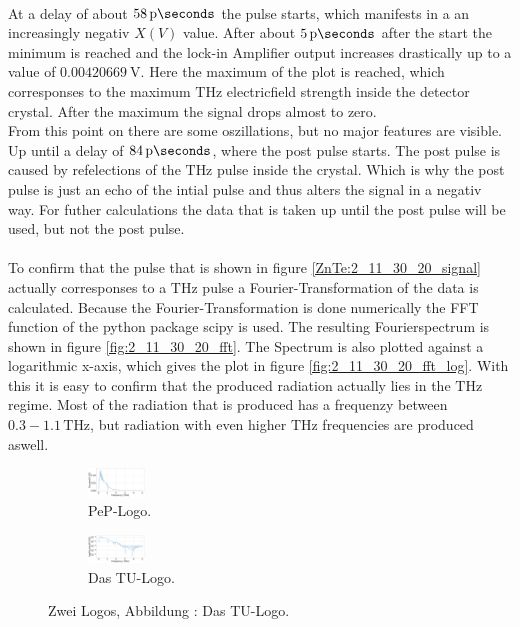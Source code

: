 \\
At a delay of about $\SI{58}{\pico\seconds}$ the pulse starts, which manifests in a an increasingly negativ $X(V)$ value.
After about $\SI{5}{\pico\seconds}$ after the start the minimum is reached and the lock-in Amplifier output increases drastically up to a value of $\SI{0.00420669}{\V}$.
Here the maximum of the plot is reached, which corresponses to the maximum $\si{\tera\hertz}$ electricfield strength inside the detector crystal.
After the maximum the signal drops almost to zero.
\\
From this point on there are some oszillations, but no major features are visible. %
Up until a delay of $\SI{84}{\pico\seconds}$, where the post pulse starts.
The post pulse is caused by refelections of the $\si{\tera\hertz}$ pulse inside the crystal.
Which is why the post pulse is just an echo of the intial pulse and thus alters the signal in a negativ way.
For futher calculations the data that is taken up until the post pulse will be used, but not the post pulse.
\\\\
\FloatBarrier
To confirm that the pulse that is shown in figure \ref{ZnTe:2_11_30_20_signal} actually corresponses to a $\si{\tera\hertz}$ pulse a Fourier-Transformation of the data is calculated. %
Because the Fourier-Transformation is done numerically the FFT function of the python package scipy \cite{scipy} is used.
The resulting Fourierspectrum is shown in figure \ref{fig:2_11_30_20_fft}.
The Spectrum is also plotted against a logarithmic x-axis, which gives the plot in figure \ref{fig:2_11_30_20_fft_log}.
With this it is easy to confirm that the produced radiation actually lies in the $\si{\tera\hertz}$ regime.
Most of the radiation that is produced has a frequenzy between $0.3-1.1\,\si{\tera\hertz}$, but radiation with even higher $\si{\tera\hertz}$ frequencies are produced aswell.
\begin{figure}%
    \begin{subfigure}{0.48\textwidth}%
        \centering%
        \includegraphics[height=0.75cm]{Plots/2_11_30_20normalFX.pdf}%
        \caption{PeP-Logo.}%
        \label{fig:pep2}%
        \end{subfigure}%
    \hfill%
        \begin{subfigure}{0.48\textwidth}%
        \centering%
        \includegraphics[height=0.75cm]{Plots/2_11_30_20normallog(FX).pdf}%
        \caption{Das TU-Logo.}%
        \label{fig:TU}%
    \end{subfigure}%
    \caption{Zwei Logos, Abbildung : Das TU-Logo.}%
    \label{fig:logos}%
\end{figure}%

